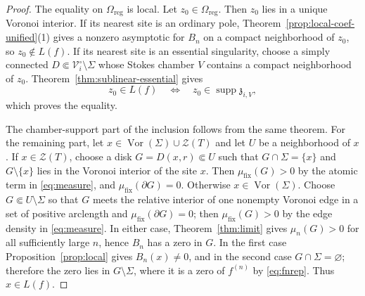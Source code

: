 \documentclass[reqno]{article}
\theoremstyle{definition}
\theoremstyle{remark}
\theoremstyle{plain}
\newcommand{\Z}{\mathcal Z}
\begin{document}
\begin{proof}
The equality on $\Omega_{\mathrm{reg}}$ is local. Let $z_0\in\Omega_{\mathrm{reg}}$. Then $z_0$ lies in a unique Voronoi interior. If its nearest site is an ordinary pole, Theorem~\ref{prop:local-coef-unified}\textup{(1)} gives a nonzero asymptotic for $B_n$ on a compact neighborhood of $z_0$, so $z_0\notin L(f)$. If its nearest site is an essential singularity, choose a simply connected $D\Subset\mathcal V_i^\circ\setminus\Sigma$ whose Stokes chamber $V$ contains a compact neighborhood of $z_0$. Theorem~\ref{thm:sublinear-essential} gives
\[
z_0\in L(f)\quad\Longleftrightarrow\quad z_0\in\operatorname{supp}\mathfrak z_{i,V},
\]
which proves the equality.

The chamber-support part of the inclusion follows from the same theorem. For the remaining part, let $x\in\operatorname{Vor}(\Sigma)\cup\Z(T)$ and let $U$ be a neighborhood of $x$. If $x\in\Z(T)$, choose a disk $G=D(x,r)\Subset U$ such that $G\cap\Sigma=\{x\}$ and $G\setminus\{x\}$ lies in the Voronoi interior of the site $x$. Then $\mu_{\mathrm{fix}}(G)>0$ by the atomic term in \eqref{eq:measure}, and $\mu_{\mathrm{fix}}(\partial G)=0$. Otherwise $x\in\operatorname{Vor}(\Sigma)$. Choose $G\Subset U\setminus\Sigma$ so that $G$ meets the relative interior of one nonempty Voronoi edge in a set of positive arclength and $\mu_{\mathrm{fix}}(\partial G)=0$; then $\mu_{\mathrm{fix}}(G)>0$ by the edge density in \eqref{eq:measure}. In either case, Theorem~\ref{thm:limit} gives $\mu_n(G)>0$ for all sufficiently large $n$, hence $B_n$ has a zero in $G$. In the first case Proposition~\ref{prop:local} gives $B_n(x)\ne0$, and in the second case $G\cap\Sigma=\varnothing$; therefore the zero lies in $G\setminus\Sigma$, where it is a zero of $f^{(n)}$ by \eqref{eq:fnrep}. Thus $x\in L(f)$.
\end{proof}
\end{document}
